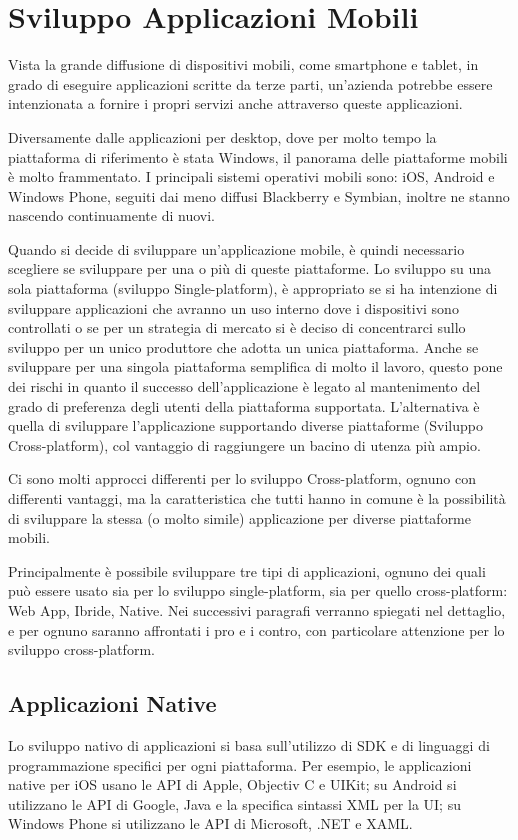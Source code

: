\chapter{Sviluppo Applicazioni Mobili}
	Vista la grande diffusione di dispositivi mobili, come smartphone e tablet, in grado di eseguire applicazioni scritte da terze parti, un'azienda potrebbe essere intenzionata a fornire i propri servizi anche attraverso queste applicazioni.
	
	Diversamente dalle applicazioni per desktop, dove per molto tempo la piattaforma di riferimento è stata Windows, il panorama delle piattaforme mobili è molto frammentato.
	I principali sistemi operativi mobili sono: iOS, Android e Windows Phone, seguiti dai meno diffusi Blackberry e Symbian, inoltre ne stanno nascendo continuamente di nuovi.
	
	Quando si decide di sviluppare un'applicazione mobile, è quindi necessario scegliere se sviluppare per una o più di queste piattaforme.
	Lo sviluppo su una sola piattaforma (sviluppo Single-platform), è appropriato se si ha intenzione di sviluppare applicazioni che avranno un uso interno dove i dispositivi sono controllati o se per un strategia di mercato si è deciso di concentrarci sullo sviluppo per un unico produttore che adotta un unica piattaforma.
	Anche se sviluppare per una singola piattaforma semplifica di molto il lavoro, questo pone dei rischi in quanto il successo dell'applicazione è legato al mantenimento del grado di preferenza degli utenti della piattaforma supportata.
	L'alternativa è quella di sviluppare l'applicazione supportando diverse piattaforme (Sviluppo Cross-platform), col vantaggio di raggiungere un bacino di utenza più ampio.
	
	Ci sono molti approcci differenti per lo sviluppo Cross-platform, ognuno con differenti vantaggi, ma la caratteristica che tutti hanno in comune è la possibilità di sviluppare la stessa (o molto simile) applicazione per diverse piattaforme mobili.
	 
	Principalmente è possibile sviluppare tre tipi di applicazioni, ognuno dei quali può essere usato sia per lo sviluppo single-platform, sia per quello cross-platform: Web App, Ibride, Native.
	Nei successivi paragrafi verranno spiegati nel dettaglio, e per ognuno saranno affrontati i pro e i contro, con particolare attenzione per lo sviluppo cross-platform.
	
	\section{Applicazioni Native}
		Lo sviluppo nativo di applicazioni si basa sull'utilizzo di SDK e di linguaggi di programmazione specifici per ogni piattaforma. Per esempio, le applicazioni native per iOS usano le API di Apple, Objectiv C e UIKit; su Android si utilizzano le API di Google, Java e la specifica sintassi XML per la UI; su Windows Phone si utilizzano le API di Microsoft, .NET e XAML.

